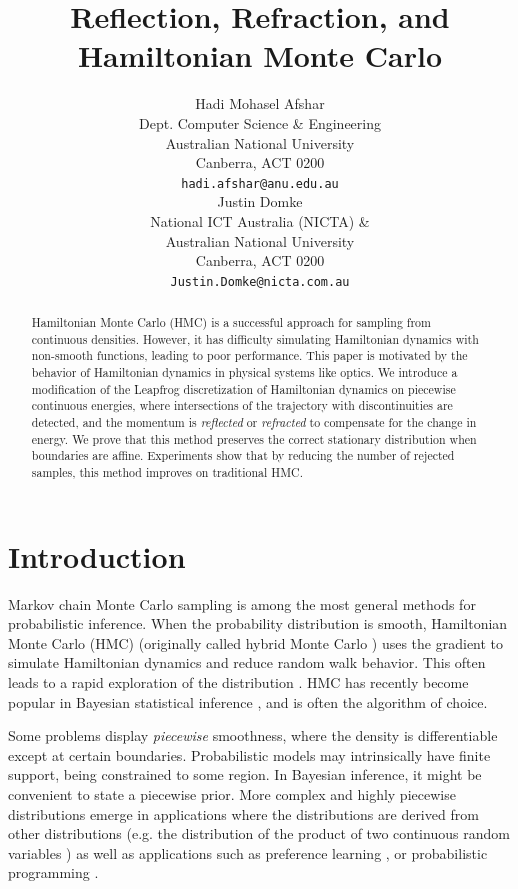 \documentclass{article} %
\title{Reflection, Refraction, and Hamiltonian Monte Carlo}
\author{
Hadi Mohasel Afshar %
\\
Dept. Computer Science \& Engineering \\
Australian National University\\
Canberra, ACT 0200\\
\texttt{hadi.afshar@anu.edu.au} \\
\And
Justin Domke\\
National ICT Australia (NICTA) \& \\Australian National University\\
Canberra, ACT 0200\\
\texttt{Justin.Domke@nicta.com.au}
}
\begin{document}
\maketitle

\begin{abstract}
Hamiltonian Monte Carlo (HMC) is a successful approach for sampling from continuous densities.  However, it has difficulty simulating Hamiltonian dynamics with non-smooth functions, leading to poor performance.  This paper is motivated by the behavior of Hamiltonian dynamics in physical systems like optics.  We introduce a modification of the Leapfrog discretization of Hamiltonian dynamics on piecewise continuous energies, where intersections of the trajectory with discontinuities are detected, and the momentum is \emph{reflected} or \emph{refracted} to compensate for the change in energy.  We prove that this method preserves the correct stationary distribution when boundaries are affine.  Experiments show that by reducing the number of rejected samples, this method improves on traditional HMC.
\end{abstract}




\section{Introduction}

Markov chain Monte Carlo sampling is among the most general methods for probabilistic inference.  When the probability distribution is smooth, Hamiltonian Monte Carlo (HMC) (originally called hybrid Monte Carlo \cite{duane1987hybrid}) uses the gradient to simulate Hamiltonian dynamics and reduce random walk behavior. This often leads to a rapid exploration of the distribution \cite{homan2014no, brooks2011handbook}.  HMC has recently become popular in Bayesian statistical inference \cite{stan-manual:2014}, and is often the algorithm of choice.



Some problems display \emph{piecewise} smoothness, where the density is differentiable except at certain boundaries.  Probabilistic models may intrinsically have finite support, being constrained to some region.  In Bayesian inference, it might be convenient to state a piecewise prior.  More complex and highly piecewise distributions emerge in applications where the distributions are derived from other distributions (e.g. the distribution of the product of two continuous random variables  \cite{ glen2004computing}) as well as  applications such as preference learning \cite{afshar2015linear}, or probabilistic programming \cite{lunn2009bugs}.
\end{document}
